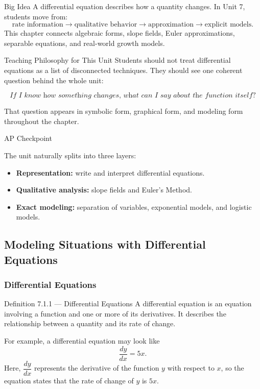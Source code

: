\documentclass[11pt]{article}
\newcommand{\apcheckpoint}[1]{%
\begin{skillbox}{AP Checkpoint}
#1
\end{skillbox}
}
\newcommand{\unitchapter}[1]{%
\newpage
\subsection{#1}
}
\newcommand{\unitsubtopic}[1]{%
\subsubsection{#1}
}
\begin{document}
\begin{theorybox}{Big Idea}
A differential equation describes how a quantity changes. In Unit 7, students move from:
\[
\text{rate information} \longrightarrow \text{qualitative behavior} \longrightarrow \text{approximation} \longrightarrow \text{explicit models}.
\]
This chapter connects algebraic forms, slope fields, Euler approximations, separable equations, and real-world growth models.
\end{theorybox}

\begin{notebox}{Teaching Philosophy for This Unit}
Students should not treat differential equations as a list of disconnected techniques.  
They should see one coherent question behind the whole unit:

\[
\textit{If I know how something changes, what can I say about the function itself?}
\]

That question appears in symbolic form, graphical form, and modeling form throughout the chapter.
\end{notebox}

\apcheckpoint{
The unit naturally splits into three layers:
\begin{itemize}
    \item \textbf{Representation:} write and interpret differential equations.
    \item \textbf{Qualitative analysis:} slope fields and Euler’s Method.
    \item \textbf{Exact modeling:} separation of variables, exponential models, and logistic models.
\end{itemize}
}

\unitchapter{Modeling Situations with Differential Equations}

\unitsubtopic{Differential Equations}

\begin{theorybox}{Definition 7.1.1 --- Differential Equations}
A differential equation is an equation involving a function and one or more of its derivatives.  
It describes the relationship between a quantity and its rate of change.
\end{theorybox}

For example, a differential equation may look like
\[
\frac{dy}{dx}=5x.
\]
Here, \(\dfrac{dy}{dx}\) represents the derivative of the function \(y\) with respect to \(x\), so the equation states that the rate of change of \(y\) is \(5x\).
\end{document}
